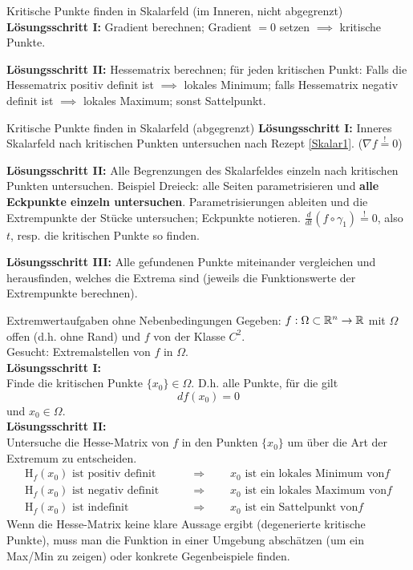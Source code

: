 \begin{Rezept}[label=Skalar1]{Kritische Punkte finden in Skalarfeld (im Inneren, nicht abgegrenzt)}{}
	\textbf{Lösungsschritt I:} Gradient berechnen; Gradient $=0$ setzen $\implies$ kritische Punkte.
	
	\textbf{Lösungsschritt II:} Hessematrix berechnen; für jeden kritischen Punkt: Falls die Hessematrix positiv definit ist $\implies$ lokales Minimum; falls Hessematrix negativ definit ist $\implies$ lokales Maximum; sonst Sattelpunkt.
\end{Rezept}

\begin{Rezept}[label=Skalar2]{Kritische Punkte finden in Skalarfeld (abgegrenzt)}{}
	\textbf{Lösungsschritt I:} Inneres Skalarfeld nach kritischen Punkten untersuchen nach Rezept \ref{Skalar1}. ($\nabla f \stackrel{!}{=} 0$)
	
	\textbf{Lösungsschritt II:} Alle Begrenzungen des Skalarfeldes einzeln nach kritischen Punkten untersuchen. Beispiel Dreieck: alle Seiten parametrisieren und \textbf{alle Eckpunkte einzeln untersuchen}. Parametrisierungen ableiten und die Extrempunkte der Stücke untersuchen; Eckpunkte notieren.
	$\frac{d}{dt}(f \circ \gamma_1) \stackrel{!}{=} 0$, also $t$, resp. die kritischen Punkte so finden.
	
	\textbf{Lösungsschritt III:} Alle gefundenen Punkte miteinander vergleichen und herausfinden, welches die Extrema sind (jeweils die Funktionswerte der Extrempunkte berechnen).
\end{Rezept}

\begin{Rezept}[label=R1]{Extremwertaufgaben ohne Nebenbedingungen}{}
	Gegeben: $f:\Omega\subset \mathbb{R}^n \to \mathbb{R}$ mit $\Omega$ offen (d.h. ohne Rand) und $f$ von der Klasse $C^2$.\\
	Gesucht: Extremalstellen von $f$ in $\Omega$.\\
	\newline
	\textbf{Lösungsschritt I:}\\
	Finde die kritischen Punkte $\{x_0\} \in \Omega$. D.h. alle Punkte, für die gilt
	\begin{equation*}
	df(x_0)=0
	\end{equation*}
	und $x_0 \in \Omega$.\\
	\textbf{Lösungsschritt II:}\\
	Untersuche die Hesse-Matrix von $f$ in den Punkten $\{x_0\}$ um über die Art der Extremum zu entscheiden.
	\begin{align*}
	\text{H}_f(x_0) \text{ ist positiv definit} \qquad &\Rightarrow \qquad x_0 \text{ ist ein lokales Minimum von} f\\
	\text{H}_f(x_0) \text{ ist negativ definit} \qquad &\Rightarrow \qquad x_0 \text{ ist ein lokales Maximum von} f\\
	\text{H}_f(x_0) \text{ ist indefinit} \qquad &\Rightarrow \qquad x_0 \text{ ist ein Sattelpunkt von} f
	\end{align*}
	Wenn die Hesse-Matrix keine klare Aussage ergibt (degenerierte kritische Punkte), muss man die Funktion in einer Umgebung abschätzen (um ein Max/Min zu zeigen) oder konkrete Gegenbeispiele finden.
\end{Rezept}

